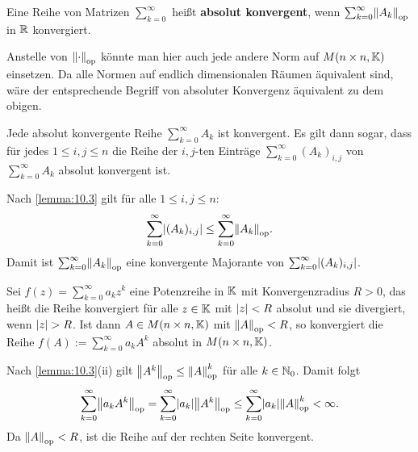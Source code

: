 \begin{definition}
	\label{def:10.4}
	Eine Reihe von Matrizen $\sum_{k=0}^{\infty}$ heißt \textbf{absolut konvergent}, wenn $\sum_{k=0}^{\infty} \opn{A_k}$ in $\mathbb{R}$ konvergiert. 
\end{definition}

\begin{bemerkung}
	\label{bem:10.5}
	Anstelle von $\left\lVert\cdot\right\rVert_{\text{op}}$ könnte man hier auch jede andere Norm auf $M(n \times n, \mathbb{K})$ einsetzen.
	Da alle Normen auf endlich dimensionalen Räumen äquivalent sind, wäre der entsprechende Begriff von absoluter Konvergenz äquivalent zu dem obigen.
\end{bemerkung}

\begin{satz}
	\label{satz:10.6}
	Jede absolut konvergente Reihe $\sum_{k=0}^{\infty} A_k$ ist konvergent.
	Es gilt dann sogar, dass für jedes $1 \leq i,j \leq n$ die Reihe der $i,j$-ten Einträge $\sum_{k=0}^{\infty} (A_k)_{i,j}$ von $\sum_{k=0}^{\infty} A_k$ absolut konvergent ist.
\end{satz}

\begin{beweis}
	Nach \autoref{lemma:10.3} gilt für alle $1 \leq i,j \leq n$:
	\[
		\sum_{k=0}^{\infty} \abs{(A_k)_{i,j}} \leq \sum_{k=0}^{\infty} \opn{A_k}.
	\]
	Damit ist $\sum_{k=0}^{\infty} \opn{A_k}$ eine konvergente Majorante von $\sum_{k=0}^{\infty} \lvert(A_k)_{i,j}\rvert$.	\qedhere
\end{beweis}

\begin{korollar}
	\label{kor:10.7}
	Sei $f(z) = \sum_{k=0}^{\infty} a_kz^k$ eine Potenzreihe in $\mathbb{K}$ mit Konvergenzradius $R > 0$, das heißt die Reihe konvergiert für alle $z \in \mathbb{K}$ mit $\lvert z\rvert < R$ absolut und sie divergiert, wenn $\lvert z\rvert > R$. 
	Ist dann $A \in M(n \times n,\mathbb{K})$ mit $\left\lVert A\right\rVert_{\text{op}} < R$, so konvergiert die Reihe $f(A) := \sum_{k=0}^{\infty} a_k A^k$ absolut in $M(n \times n,\mathbb{K})$.
\end{korollar}

\begin{beweis}
	Nach \autoref{lemma:10.3}(ii) gilt $\left\lVert A^k\right\rVert_{\text{op}} \leq \left\lVert A\right\rVert_{\text{op}}^k$ für alle $k \in \mathbb{N}_0$.
	Damit folgt
	\[
		\sum_{k=0}^{\infty} \opn{a_k A^k} = \sum_{k=0}^{\infty} \abs{a_k} \opn{A^k} \leq \sum_{k=0}^{\infty} \abs{a_k} \opn{A}^k < \infty.
	\]
	Da $\left\lVert A\right\rVert_{\text{op}} < R$, ist die Reihe auf der rechten Seite konvergent. \qedhere
\end{beweis}

